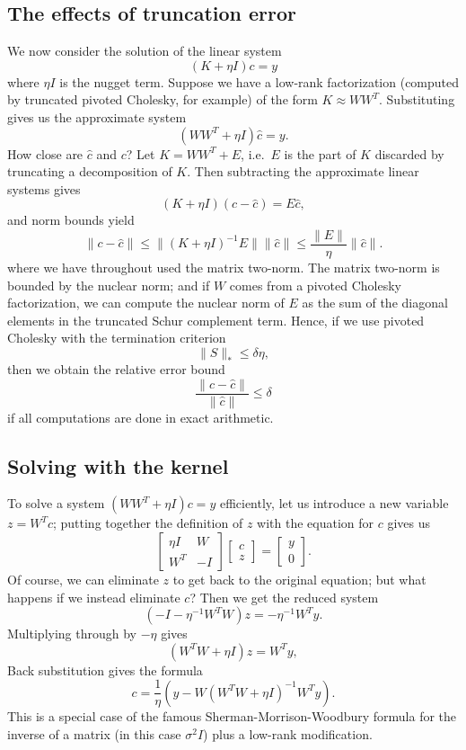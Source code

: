 \documentclass[12pt, leqno]{article} %
\begin{document}

\subsection{The effects of truncation error}

We now consider the solution of the linear system
\[
  (K + \eta I) c = y
\]
where $\eta I$ is the nugget term.  Suppose we have a low-rank
factorization (computed by truncated pivoted Cholesky, for example)
of the form $K \approx WW^T$.  Substituting gives us the approximate
system
\[
  (W W^T + \eta I) \hat{c} = y.
\]
How close are $\hat{c}$ and $c$?  Let $K = W W^T + E$, i.e.~$E$ is
the part of $K$ discarded by truncating a decomposition of $K$.
Then subtracting the approximate linear systems gives
\[
  (K+\eta I) (c-\hat{c}) = E \hat{c},
\]
and norm bounds yield
\[
  \|c-\hat{c}\| \leq
  \|(K+\eta I)^{-1} E\| \|\hat{c}\| \leq
  \frac{\|E\|}{\eta} \|\hat{c}\|.
\]
where we have throughout used the matrix two-norm.  The matrix
two-norm is bounded by the nuclear norm; and if $W$ comes from
a pivoted Cholesky factorization, we can compute the
nuclear norm of $E$ as the sum of the diagonal elements in the
truncated Schur complement term.  Hence, if we use pivoted Cholesky
with the termination criterion
\[
  \|S\|_* \leq \delta \eta,
\]
then we obtain the relative error bound
\[
  \frac{\|c-\hat{c}\|}{\|\hat{c}\|} \leq \delta
\]
if all computations are done in exact arithmetic.

\subsection{Solving with the kernel}

To solve a system $(WW^T + \eta I) c = y$ efficiently,
let us introduce a new variable $z = W^T c$; putting together the
definition of $z$ with the equation for $c$ gives us
\[
  \begin{bmatrix} \eta I & W \\ W^T & -I \end{bmatrix}
  \begin{bmatrix} c \\ z \end{bmatrix} =
  \begin{bmatrix} y \\ 0 \end{bmatrix}.
\]
Of course, we can eliminate $z$ to get back to the original
equation; but what happens if we instead eliminate $c$?  Then we
get the reduced system
\[
  (-I-\eta^{-1} W^T W) z = -\eta^{-1} W^T y.
\]
Multiplying through by $-\eta$ gives
\[
  (W^T W + \eta I) z = W^T y,
\]
Back substitution gives the formula
\[
  c = \frac{1}{\eta} \left( y - W (W^T W + \eta I)^{-1} W^T y \right).
\]
This is a special case of the famous Sherman-Morrison-Woodbury formula
for the inverse of a matrix (in this case $\sigma^2 I$) plus a
low-rank modification.
\end{document}
